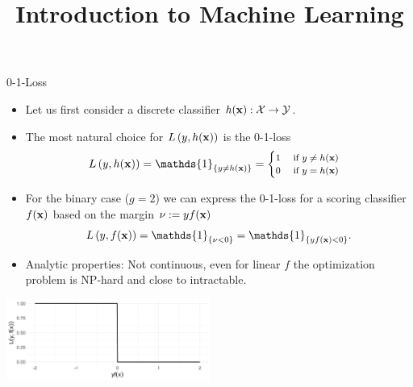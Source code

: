 \documentclass[11pt,compress,t,notes=noshow, xcolor=table]{beamer}
\title{Introduction to Machine Learning}
\institute{\href{https://compstat-lmu.github.io/lecture_i2ml/}{compstat-lmu.github.io/lecture\_i2ml}}
\date{}
\begin{document}

\begin{vbframe}{0-1-Loss}

\begin{itemize}
  \item Let us first consider a discrete classifier $h(\mathbf{x}): \mathcal{X} \to \mathcal{Y}$. 
  \item The most natural choice for $L\left(y, h(\mathbf{x})\right)$ is the 0-1-loss 
  \vspace*{-0.2cm}
  $$
  \Lhxy = \mathds{1}_{\{y \ne \hx\}} =
     \footnotesize \begin{cases} 1 \quad \text{ if } y \ne \hx \\ 0 \quad    \text{ if } y = \hx  \end{cases}
  $$
  \item For the binary case ($g = 2$) we can express the 0-1-loss for a scoring classifier $f(\mathbf{x})$ based on the margin $\nu := yf(\mathbf{x})$
  \vspace*{-0.2cm}
  $$
  \Lxy = \mathds{1}_{\{\nu < 0\}} = \mathds{1}_{\{y\fx < 0\}}. 
  $$
  \item Analytic properties:  Not continuous, even for linear $f$ the optimization problem is NP-hard and close to intractable.
\end{itemize}

\begin{center}
\includegraphics[width = 0.5\textwidth]{figure/plot_loss_01.png}
\end{center}

\end{vbframe}
\end{document}

